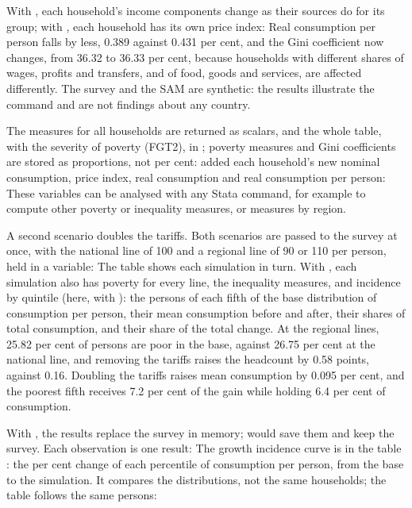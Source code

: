 
With , each household's income components change as their
sources do for its group; with , each household has its own
price index:
Real consumption per person falls by less, 0.389 against 0.431 per cent, and
the Gini coefficient now changes, from 36.32 to 36.33 per cent, because
households with different shares of wages, profits and transfers, and of
food, goods and services, are affected differently. The survey and the SAM
are synthetic: the results illustrate the command and are not findings about
any country.


The measures for all households are returned as scalars, and the whole table,
with the severity of poverty (FGT2), in ; poverty measures and
Gini coefficients are stored as proportions, not per cent:
 added each household's new nominal consumption, price
index, real consumption and real consumption per person:
These variables can be analysed with any Stata command, for example to
compute other poverty or inequality measures, or measures by region.


A second scenario doubles the tariffs. Both scenarios are passed to the
survey at once, with the national line of 100 and a regional line of 90 or
110 per person, held in a variable:
The table shows each simulation in turn. With , each simulation
also has poverty for every line, the inequality measures, and incidence by
quintile (here, with ): the persons of each fifth of the
base distribution of consumption per person, their mean consumption before
and after, their shares of total consumption, and their share of the total
change. At the regional lines, 25.82 per cent of persons are poor in the base,
against 26.75 per cent at the national line, and removing the tariffs raises
the headcount by 0.58 points, against 0.16. Doubling the tariffs raises mean
consumption by 0.095 per cent, and the poorest fifth receives 7.2 per cent of
the gain while holding 6.4 per cent of consumption.


With , the results replace the survey in memory; 
would save them and keep the survey. Each observation is one result:
The growth incidence curve is in the table : the per cent change of
each percentile of consumption per person, from the base to the simulation.
It compares the distributions, not the same households; the table
 follows the same persons:


